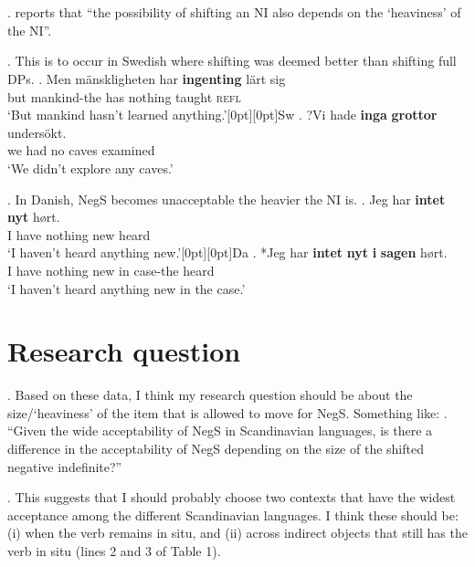 \documentclass[12pt, letterpaper]{article}
\newcommand{\rcommentg}[1]{\hfill\raisebox{1.9\baselineskip}[0pt][0pt]{#1}} %
\begin{document}
\section{\cite{penkaNegativeIndefinites2011}}

\ex. \citet[176]{penkaNegativeIndefinites2011} reports that “the possibility of shifting an NI also depends on the `heaviness' of the NI”.

\ex. This is to occur in Swedish where shifting was deemed better than shifting full DPs.
\ag. Men mänskligheten har \textbf{ingenting} lärt sig\\
but mankind-the has nothing taught \textsc{refl}\\
`But mankind hasn't learned anything.'\rcommentg{Sw}
\bg. ?Vi hade \textbf{inga} \textbf{grottor} undersökt.\\
we had no caves examined\\
`We didn't explore any caves.'
 
\ex. In Danish, NegS becomes unacceptable the heavier the NI is.
\ag. Jeg har \textbf{intet} \textbf{nyt} hørt.\\
I have nothing new heard\\
`I haven't heard anything new.'\rcommentg{Da}
\bg. *Jeg har \textbf{intet} \textbf{nyt} \textbf{i} \textbf{sagen} hørt.\\
I have nothing new in case-the heard\\
`I haven't heard anything new in the case.'


\section{Research question}

\ex. Based on these data, I think my research question should be about the size/`heaviness' of the item that is allowed to move for NegS. Something like:
\a. “Given the wide acceptability of NegS in Scandinavian languages, is there a difference in the acceptability of NegS depending on the size of the shifted negative indefinite?”

\ex. This suggests that I should probably choose two contexts that have the widest acceptance among the different Scandinavian languages. I think these should be: (i) when the verb remains in situ, and (ii) across indirect objects that still has the verb in situ (lines 2 and 3 of Table 1). 
\end{document}

